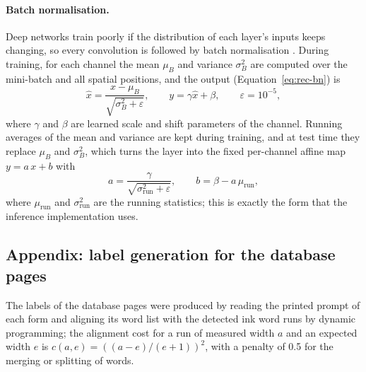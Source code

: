 \paragraph{Batch normalisation.}
Deep networks train poorly if the distribution of each layer's inputs keeps changing, so every convolution is followed by batch normalisation \cite{ioffe2015}.
During training, for each channel the mean $\mu_B$ and variance $\sigma_B^2$ are computed over the mini-batch and all spatial positions, and the output (Equation~\ref{eq:rec-bn}) is
\begin{equation}
\hat x=\frac{x-\mu_B}{\sqrt{\sigma_B^2+\varepsilon}},\qquad y=\gamma\hat x+\beta,\qquad\varepsilon=10^{-5},
\label{eq:rec-bn}
\end{equation}
where $\gamma$ and $\beta$ are learned scale and shift parameters of the channel.
Running averages of the mean and variance are kept during training, and at test time they replace $\mu_B$ and $\sigma_B^2$, which turns the layer into the fixed per-channel affine map $y=a\,x+b$ with
\begin{equation}
a=\frac{\gamma}{\sqrt{\sigma^2_{\mathrm{run}}+\varepsilon}},\qquad b=\beta-a\,\mu_{\mathrm{run}},
\label{eq:rec-bnfold}
\end{equation}
where $\mu_{\mathrm{run}}$ and $\sigma^2_{\mathrm{run}}$ are the running statistics; this is exactly the form that the inference implementation uses.


\subsection{Appendix: label generation for the database pages}

The labels of the database pages were produced by reading the printed prompt of each form and aligning its word list with the detected ink word runs by dynamic programming; the alignment cost for a run of measured width $a$ and an expected width $e$ is $c(a,e)=((a-e)/(e+1))^2$, with a penalty of 0.5 for the merging or splitting of words.
